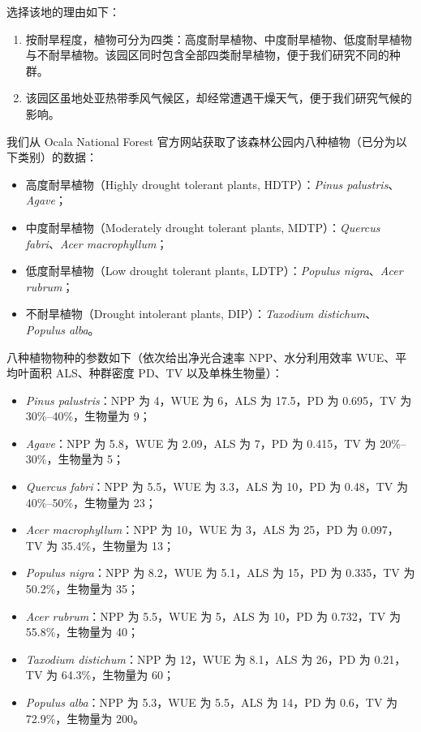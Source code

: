 \documentclass[11pt,a4paper]{ctexart}
\begin{document}
选择该地的理由如下：

\begin{enumerate}
\item 按耐旱程度，植物可分为四类：高度耐旱植物、中度耐旱植物、低度耐旱植物与不耐旱植物\cite{ref7}。该园区同时包含全部四类耐旱植物，便于我们研究不同的种群。
\item 该园区虽地处亚热带季风气候区，却经常遭遇干燥天气，便于我们研究气候的影响。
\end{enumerate}

我们从 Ocala National Forest 官方网站获取了该森林公园内八种植物（已分为以下类别）的数据：

\begin{itemize}
\item 高度耐旱植物（Highly drought tolerant plants, HDTP）：\textit{Pinus palustris}、\textit{Agave}；
\item 中度耐旱植物（Moderately drought tolerant plants, MDTP）：\textit{Quercus fabri}、\textit{Acer macrophyllum}；
\item 低度耐旱植物（Low drought tolerant plants, LDTP）：\textit{Populus nigra}、\textit{Acer rubrum}；
\item 不耐旱植物（Drought intolerant plants, DIP）：\textit{Taxodium distichum}、\textit{Populus alba}。
\end{itemize}

八种植物物种的参数如下（依次给出净光合速率 NPP、水分利用效率 WUE、平均叶面积 ALS、种群密度 PD、TV 以及单株生物量）：

\begin{itemize}
\item \textit{Pinus palustris}：NPP 为 4，WUE 为 6，ALS 为 17.5，PD 为 0.695，TV 为 30\%--40\%，生物量为 9；
\item \textit{Agave}：NPP 为 5.8，WUE 为 2.09，ALS 为 7，PD 为 0.415，TV 为 20\%--30\%，生物量为 5；
\item \textit{Quercus fabri}：NPP 为 5.5，WUE 为 3.3，ALS 为 10，PD 为 0.48，TV 为 40\%--50\%，生物量为 23；
\item \textit{Acer macrophyllum}：NPP 为 10，WUE 为 3，ALS 为 25，PD 为 0.097，TV 为 35.4\%，生物量为 13；
\item \textit{Populus nigra}：NPP 为 8.2，WUE 为 5.1，ALS 为 15，PD 为 0.335，TV 为 50.2\%，生物量为 35；
\item \textit{Acer rubrum}：NPP 为 5.5，WUE 为 5，ALS 为 10，PD 为 0.732，TV 为 55.8\%，生物量为 40；
\item \textit{Taxodium distichum}：NPP 为 12，WUE 为 8.1，ALS 为 26，PD 为 0.21，TV 为 64.3\%，生物量为 60；
\item \textit{Populus alba}：NPP 为 5.3，WUE 为 5.5，ALS 为 14，PD 为 0.6，TV 为 72.9\%，生物量为 200。
\end{itemize}
\end{document}
